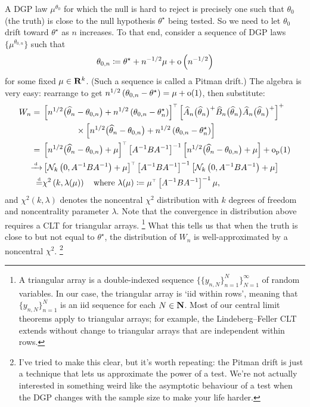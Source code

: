 \documentclass[11pt,letterpaper,reqno,oneside]{article}
\begin{document}
A DGP law $\mu^{\theta_0}$ for which the null is hard to reject is precisely one such that $\theta_0$ (the truth) is close to the null hypothesis $\theta^\star$ being tested. So we need to let $\theta_0$ drift toward $\theta^\star$ as $n$ increases. To that end, consider a sequence of DGP laws $\bigl\{ \mu^{\theta_{0,n}} \bigr\}$ such that
%
\begin{equation*}
	\theta_{0,n} \coloneqq \theta^\star + n^{-1/2} \mu + \mathrm{o}\left( n^{-1/2} \right) 
\end{equation*}
%
for some fixed $\mu \in \mathbf{R}^k$. (Such a sequence is called a Pitman drift.) The algebra is very easy: rearrange to get $n^{1/2} \left( \theta_{0,n} - \theta^\star \right) = \mu + \mathrm{o}(1)$, then substitute:
%
\begin{align*}
	W_n
	={}& \left[ n^{1/2} \bigl( \widehat{\theta}_n - \theta_{0,n} \bigr) 
	+ n^{1/2} \left( \theta_{0,n} - \theta^\star_n \right) \right]^{\scriptscriptstyle \top}
	\left[ \widehat{A}_n\bigl( \widehat{\theta}_n \bigr)^+ 
	\widehat{B}_n\bigl( \widehat{\theta}_n \bigr)
	\widehat{A}_n\bigl( \widehat{\theta}_n \bigr)^+ \right]^+
	\\
	&\quad\quad\quad\quad\times
	\left[ n^{1/2} \bigl( \widehat{\theta}_n - \theta_{0,n} \bigr) 
	+ n^{1/2} \left( \theta_{0,n} - \theta^\star_n \right) \right]
	\\
	={}& \left[ n^{1/2} \bigl( \widehat{\theta}_n - \theta_{0,n} \bigr) + \mu \right]^{\scriptscriptstyle \top}
	\left[ A^{-1} B A^{-1} \right]^{-1}
	\left[ n^{1/2} \bigl( \widehat{\theta}_n - \theta_{0,n} \bigr) + \mu \right]
	+ \mathrm{o}_{\mathrm{p}}(1)
	\\
	\xrightarrow{{\scriptscriptstyle \mathrm{\;d\;}}}& \left[ \mathcal{N}_k\left( 0, A^{-1} B A^{-1} \right) + \mu \right]^{\scriptscriptstyle \top}
	\left[ A^{-1} B A^{-1} \right]^{-1}
	\left[ \mathcal{N}_k\left( 0, A^{-1} B A^{-1} \right) + \mu \right]
	\\
	\protect\overset{{\scriptscriptstyle \mathrm{d}}}{=}& \chi^2 \left( k, \lambda(\mu) \right)
	\quad\text{where 
	$\lambda(\mu) \coloneqq \mu^{\scriptscriptstyle \top} \left[ A^{-1} B A^{-1} \right]^{-1} \mu$} ,
\end{align*}
%
and $\chi^2(k,\lambda)$ denotes the noncentral $\chi^2$ distribution with $k$ degrees of freedom and noncentrality parameter $\lambda$. Note that the convergence in distribution above requires a CLT for triangular arrays.%
	\footnote{A triangular array is a double-indexed sequence $\{ \{ y_{n,N} \}_{n=1}^N \}_{N=1}^\infty$ of random variables. In our case, the triangular array is `iid within rows', meaning that $\{ y_{n,N} \}_{n=1}^N$ is an iid sequence for each $N \in \mathbf{N}$. Most of our central limit theorems apply to triangular arrays; for example, the Lindeberg--Feller CLT extends without change to triangular arrays that are independent within rows.}
What this tells us that when the truth is close to but not equal to $\theta^\star$, the distribution of $W_n$ is well-approximated by a noncentral $\chi^2$.%
	\footnote{I've tried to make this clear, but it's worth repeating: the Pitman drift is just a technique that lets us approximate the power of a test. We're not actually interested in something weird like the asymptotic behaviour of a test when the DGP changes with the sample size to make your life harder.}
\end{document}
